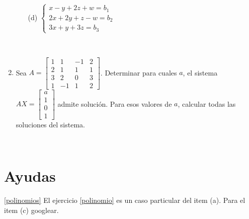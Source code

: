 \documentclass[12pt]{amsart}
\begin{document}
\begin{enumerate}[resume]
\begin{multicols}{3}
\begin{enumerate}
\item[(d)]  $\left\{\begin{array}{l}x-y+2z+w = b_1 \\ 2x+2y+z-w =b_2 \\ 3x+y+3z = b_3\end{array}\right.$
\end{enumerate}
\end{multicols}

\

\item Sea $A=\begin{bmatrix}1 & 1 & -1& 2 \\2 & 1 & 1 & 1 \\3&2&0&3\\1&-1&1&2\end{bmatrix}$.
Determinar para cuales $a$,  el sistema $AX=\left[\begin{array}{c}
     a\\1\\0\\1 \end{array}\right]$ admite soluci\'on. Para esos valores de $a$, calcular todas las soluciones del sistema.

\end{enumerate}

\

\medskip

\section*{Ayudas}
\eqref{polinomios} El ejercicio \eqref{polinomio} es un caso particular del item (a). Para el item (c) googlear.
\end{document}
